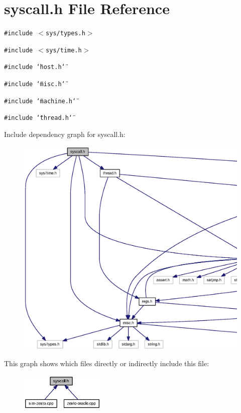 \section{syscall.h File Reference}
\label{syscall_8h}
{\tt \#include $<$sys/types.h$>$}\par
{\tt \#include $<$sys/time.h$>$}\par
{\tt \#include \char`\"{}host.h\char`\"{}}\par
{\tt \#include \char`\"{}misc.h\char`\"{}}\par
{\tt \#include \char`\"{}machine.h\char`\"{}}\par
{\tt \#include \char`\"{}thread.h\char`\"{}}\par


Include dependency graph for syscall.h:\nopagebreak
\begin{figure}[H]
\begin{center}
\leavevmode
\includegraphics[width=420pt]{syscall_8h__incl}
\end{center}
\end{figure}


This graph shows which files directly or indirectly include this file:\nopagebreak
\begin{figure}[H]
\begin{center}
\leavevmode
\includegraphics[width=114pt]{syscall_8h__dep__incl}
\end{center}
\end{figure}
